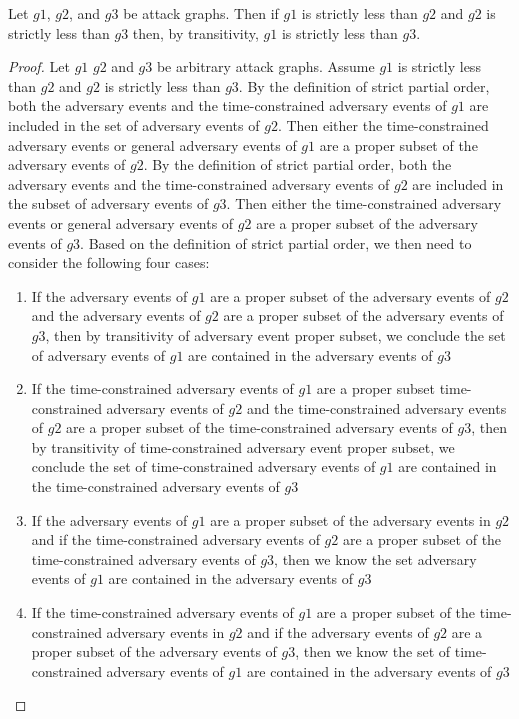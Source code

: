 \documentclass[runningheads]{llncs}
\theoremstyle{definition}
\newcommand{\squash}{\itemsep=0pt\parskip=0pt}
\begin{document}
\begin{theorem}
    Let $g1$, $g2$, and $g3$ be attack graphs. Then if $g1$ is strictly less than $g2$ and $g2$ is strictly less than $g3$ then, by transitivity, $g1$ is strictly less than $g3$. 
\end{theorem}
\begin{proof}
    Let $g1$ $g2$ and $g3$ be arbitrary attack graphs. Assume $g1$ is strictly less than $g2$ and $g2$ is strictly less than $g3$. By the definition of strict partial order, both the adversary events and the time-constrained adversary events of $g1$ are included in the set of adversary events of $g2$. Then either the time-constrained adversary events or general adversary events of $g1$ are a proper subset of the adversary events of $g2$.  By the definition of strict partial order, both the adversary events and the time-constrained adversary events of $g2$ are included in the subset of adversary events of $g3$. Then either the time-constrained adversary events or general adversary events of $g2$ are a proper subset of the adversary events of $g3$. Based on the definition of strict partial order, we then need to consider the following four cases: 
    \begin{enumerate}
        \squash
        \item If the adversary events of $g1$ are a proper subset of the adversary events of $g2$ and the adversary events of $g2$ are a proper subset of the adversary events of $g3$, then by transitivity of adversary event proper subset, we conclude the set of adversary events of $g1$ are contained in the adversary events of $g3$ 
        \item If the time-constrained adversary events of $g1$ are a proper subset time-constrained adversary events of $g2$ and the time-constrained adversary events of $g2$ are a proper subset of the time-constrained adversary events of $g3$, then by transitivity of time-constrained adversary event proper subset, we conclude the set of time-constrained adversary events of $g1$ are contained in the time-constrained adversary events of $g3$  
        \item If the adversary events of $g1$ are a proper subset of the adversary events in $g2$ and if the time-constrained adversary events of $g2$ are a proper subset of the time-constrained adversary events of $g3$, then we know the set adversary events of $g1$ are contained in the adversary events of $g3$
        \item If the time-constrained adversary events of $g1$ are a proper subset of the time-constrained adversary events in $g2$ and if the adversary events of $g2$ are a proper subset of the adversary events of $g3$, then we know the set of time-constrained adversary events of $g1$ are contained in the adversary events of $g3$

\end{enumerate}
\end{proof}
\end{document}
